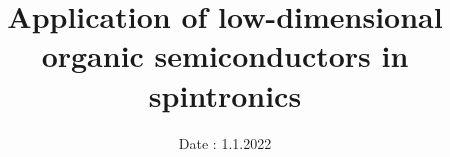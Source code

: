 

\subject{\vspace{-4cm}Semiconductor materials and nanostructures}  %
\title{\vspace{-0.5cm}Application of low-dimensional organic semiconductors in spintronics} %
\date{\vspace{-0.5cm}
 Date : 1.1.2022  %
}




\twocolumn[
\maketitle
\begin{onecolabstract}
  
\end{onecolabstract}
]


% 
% 


\printbibliography{}


